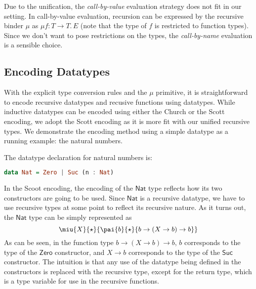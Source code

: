 Due to the unification, the \emph{call-by-value} evaluation strategy does not fit in our setting. In call-by-value evaluation, recursion can be expressed by the recursive binder $\mu$ as $\mu f : T \rightarrow T.\, E$ (note that the type of $f$ is restricted to function types). Since we don't want to pose restrictions on the types, the \emph{call-by-name}  evaluation is a sensible choice.


\subsection{Encoding Datatypes}


\newcommand{\Nat}{\mathsf{Nat}} \newcommand{\zero}{\mathsf{Zero}}
\newcommand{\suc}{\mathsf{Suc}} \newcommand{\plus}{\mathsf{plus}}
\newcommand{\List}{\mathsf{List}} \newcommand{\nil}{\mathsf{nil}}
\newcommand{\cons}{\mathsf{cons}}
\newcommand{\length}{\mathsf{length}}
\newcommand{\case}{\mathbf{case}} \newcommand{\of}{\mathbf{of}}
\newcommand{\data}{\mathbf{data}} \newcommand{\where}{\mathbf{where}}
\newcommand{\letbb}{\mathbf{let}} \newcommand{\inb}{\mathbf{in}}

With the explicit type conversion rules and the $\mu$ primitive, it is straightforward to encode recursive datatypes and recusive functions using datatypes. While inductive datatypes can be encoded using either the Church or the Scott encoding, we adopt the Scott encoding as it is more fit with our unified recursive types. We demonstrate the encoding method using a simple datatype as a running example: the natural numbers.

The datatype declaration for natural numbers is:
\begin{lstlisting}[language=Haskell]
  data Nat = Zero | Suc (n : Nat)
\end{lstlisting}
In the Scoot encoding, the encoding of the $\Nat$ type reflects how its two constructors are going to be used. Since $\Nat$ is a recursive datatype, we have to use recursive types at some point to reflect its recursive nature. As it turns out, the $\Nat$ type can be simply represented as
\[\miu{X}{\star}{\pai{b}{\star}{b \rightarrow (X \rightarrow b) \rightarrow b}}\]
As can be seen, in the function type $b \rightarrow (X \rightarrow b) \rightarrow b$, $b$ corresponds to the type of the $\zero$ constructor, and $X \rightarrow b$ corresponds to the type of the $\suc$ constructor. The intuition is that any use of the datatype being defined in the constructors is replaced with the recursive type, except for the return type, which is a type variable for use in the recursive functions.


